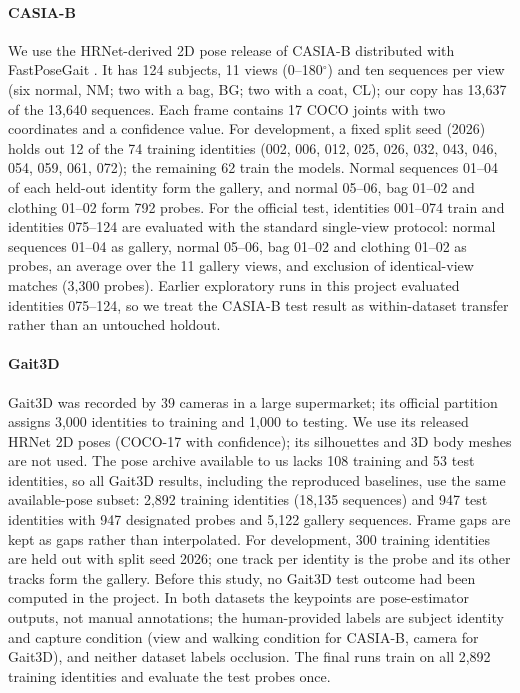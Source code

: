 \documentclass[journal]{IEEEtran}
\begin{document}
\paragraph{CASIA-B}
We use the HRNet-derived \cite{sun2019hrnet} 2D pose release of CASIA-B
\cite{yu2006casia} distributed with FastPoseGait \cite{meng2023fastposegait}.
It has 124 subjects, 11 views (0--180$^\circ$) and ten sequences per view
(six normal, NM; two with a bag, BG; two with a coat, CL); our copy has 13,637
of the 13,640 sequences. Each frame contains 17 COCO joints \cite{lin2014coco} with two
coordinates and a confidence value. For development, a fixed split seed (2026) holds out 12 of
the 74 training identities (002, 006, 012, 025, 026, 032, 043, 046, 054, 059,
061, 072); the remaining 62 train the models. Normal sequences 01--04 of each
held-out identity form the gallery, and normal 05--06, bag 01--02 and clothing
01--02 form 792 probes. For
the official test, identities 001--074 train and identities 075--124 are
evaluated with the standard single-view protocol: normal sequences 01--04 as
gallery, normal 05--06, bag 01--02 and clothing 01--02 as probes, an average
over the 11 gallery views, and exclusion of identical-view matches (3,300
probes). Earlier exploratory runs in this project evaluated identities
075--124, so we treat the CASIA-B test result as within-dataset transfer rather
than an untouched holdout.

\paragraph{Gait3D}
Gait3D \cite{zheng2022gait3d} was recorded by 39 cameras in a large supermarket; its
official partition assigns 3,000 identities to training and 1,000 to testing.
We use its released HRNet 2D poses (COCO-17 with confidence); its silhouettes
and 3D body meshes are not used. The pose archive
available to us lacks 108 training and 53 test identities, so all Gait3D
results, including the reproduced baselines, use the same available-pose
subset: 2,892 training identities (18,135 sequences) and 947 test identities
with 947 designated probes and 5,122 gallery sequences. Frame gaps are kept as
gaps rather than interpolated. For development, 300 training identities are
held out with split seed 2026; one track per identity is the probe and its
other tracks form the gallery. Before this study, no Gait3D test outcome had
been computed in the project. In both datasets the keypoints are pose-estimator
outputs, not manual annotations; the human-provided labels are subject identity
and capture condition (view and walking condition for CASIA-B, camera for
Gait3D), and neither dataset labels occlusion. The final runs train on all 2,892 training
identities and evaluate the test probes once.
\end{document}
